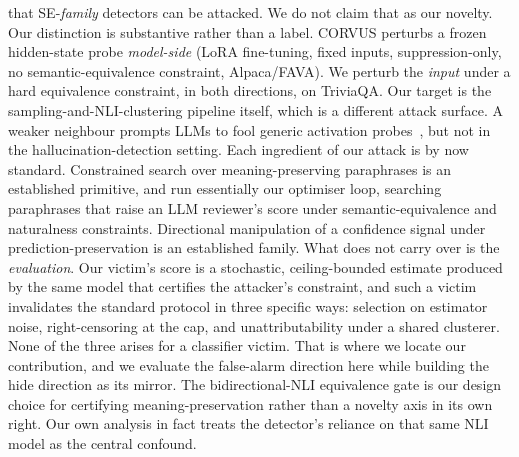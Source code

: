 that SE-\emph{family} detectors can be attacked. We do not claim that as our novelty. Our
distinction is substantive rather than a label. CORVUS perturbs a frozen hidden-state probe
\emph{model-side} (LoRA fine-tuning, fixed inputs, suppression-only, no
semantic-equivalence constraint, Alpaca/FAVA). We perturb the \emph{input} under a
hard equivalence constraint, in both directions, on TriviaQA. Our target is the
sampling-and-NLI-clustering pipeline itself, which is a different attack surface. A weaker
neighbour prompts LLMs to fool generic activation probes~\citep{blandfort2025redteamprobes},
but not in the hallucination-detection setting. Each ingredient of our attack is by now
standard. Constrained search over meaning-preserving paraphrases is an established
primitive, and \citet{kaneko2026paa} run essentially our optimiser loop, searching
paraphrases that raise an LLM reviewer's score under semantic-equivalence and naturalness
constraints. Directional manipulation of a confidence signal under prediction-preservation
is an established family. What does not carry over is the \emph{evaluation}. Our victim's
score is a stochastic, ceiling-bounded estimate produced by the same model that certifies
the attacker's constraint, and such a victim invalidates the standard protocol in three
specific ways: selection on estimator noise, right-censoring at the cap, and
unattributability under a shared clusterer. None of the three arises for a classifier
victim. That is where we locate our contribution, and we evaluate the false-alarm direction
here while building the hide direction as its mirror. The bidirectional-NLI equivalence gate
is our design choice for certifying meaning-preservation rather than a novelty axis in its
own right. Our own analysis in fact treats the detector's reliance on that same NLI model as
the central confound.

